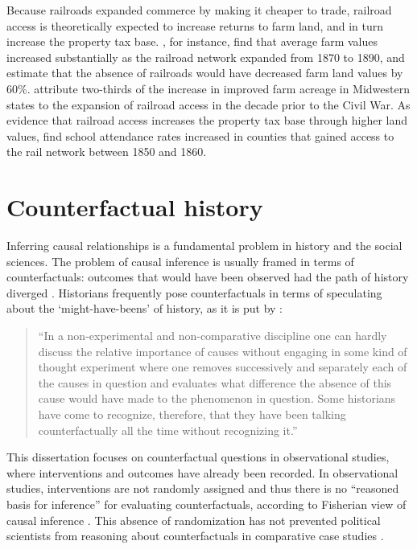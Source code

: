 Because railroads expanded commerce by making it cheaper to trade, railroad access is theoretically expected to increase returns to farm land, and in turn increase the property tax base. \citet{donaldson2016railroads}, for instance, find that average farm values increased substantially as the railroad network expanded from 1870 to 1890, and estimate that the absence of railroads would have decreased farm land values by 60\%. \citet{atack2011impact} attribute two-thirds of the increase in improved farm acreage in Midwestern states to the expansion of railroad access in the decade prior to the Civil War. As evidence that railroad access increases the property tax base through higher land values, \citet{atack2012impact} find school attendance rates increased in counties that gained access to the rail network between 1850 and 1860. 

\section{Counterfactual history}

Inferring causal relationships is a fundamental problem in history and the social sciences. The problem of causal inference is usually framed in terms of counterfactuals: outcomes that would have been observed had the path of history diverged \citep{lewis2013counterfactuals,pearl2009causality,imbens2015causal}. Historians frequently pose counterfactuals in terms of speculating about the `might-have-beens' of history, as it is put by  \citet{elster1978logic}:

\begin{quote}
``In a non-experimental and non-comparative discipline one can hardly discuss the
relative importance of causes without engaging in some kind of thought experiment where one removes successively and separately each of the causes in
question and evaluates what difference the absence of this cause would have
made to the phenomenon in question. Some historians have come to recognize,
therefore, that they have been talking counterfactually all the time without
recognizing it.''
\end{quote}

This dissertation focuses on counterfactual questions in observational studies, where interventions and outcomes have already been recorded. In observational studies, interventions are not randomly assigned and thus there is no ``reasoned basis for inference'' for evaluating counterfactuals, according to Fisherian view of causal inference \citep{fisher1935}. This absence of randomization has not prevented political scientists from reasoning about counterfactuals in comparative case studies \citep{fearon1991counterfactuals, tetlock1996counterfactual,abadie2010synthetic,abadie2015comparative}.%

